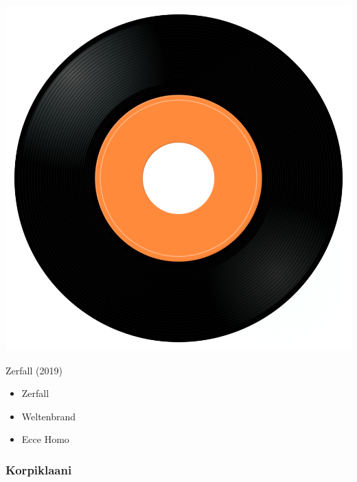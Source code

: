 \begin{minipage}[t]{0.25\textwidth}\vspace{0pt}
\captionsetup{type=figure}
\includegraphics[width=\textwidth]{Images/cover.png}
\caption*{Zerfall (2019)}
\end{minipage}
\begin{minipage}[t]{0.25\textwidth}\vspace{0pt}
\begin{itemize}[nosep,leftmargin=1em,labelwidth=*,align=left]
	\setlength{\itemsep}{0pt}
	\item Zerfall
	\item Weltenbrand
	\item Ecce Homo
\end{itemize}
\end{minipage}

\subsubsection{Korpiklaani}


